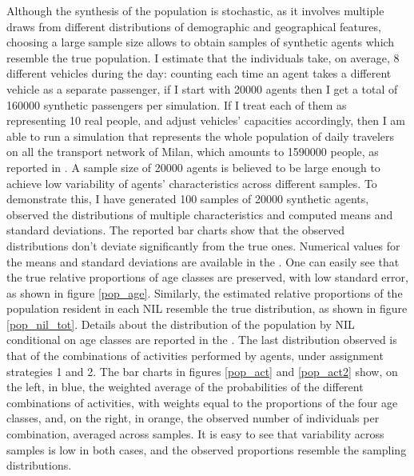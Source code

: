 Although the synthesis of the population is stochastic, as it involves multiple draws from different distributions of demographic and geographical features, choosing a large sample size allows to obtain samples of synthetic agents which resemble the true population. I estimate that the individuals take, on average, 8 different vehicles during the day: counting each time an agent takes a different vehicle as a separate passenger, if I start with 20000 agents then I get a total of 160000 synthetic passengers per simulation. If I treat each of them as representing 10 real people, and adjust vehicles' capacities accordingly, then I am able to run a simulation that represents the whole population of daily travelers on all the transport network of Milan, which amounts to 1590000 people, as reported in \cite{site20}. A sample size of 20000 agents is believed to be large enough to achieve low variability of agents' characteristics across different samples. To demonstrate this, I have generated 100 samples of 20000 synthetic agents, observed the distributions of multiple characteristics and computed means and standard deviations. The reported bar charts show that the observed distributions don't deviate significantly from the true ones. Numerical values for the means and standard deviations are available in the .
One can easily see that the true relative proportions of age classes are preserved, with low standard error, as shown in figure \ref{pop_age}. Similarly, the estimated relative proportions of the population resident in each NIL resemble the true distribution, as shown in figure \ref{pop_nil_tot}. Details about the distribution of the population by NIL conditional on age classes are reported in the . The last distribution observed is that of the combinations of activities performed by agents, under assignment strategies 1 and 2. The bar charts in figures \ref{pop_act} and \ref{pop_act2} show, on the left, in blue, the weighted average of the probabilities of the different combinations of activities, with weights equal to the proportions of the four age classes, and, on the right, in orange, the observed number of individuals per combination, averaged across samples. It is easy to see that variability across samples is low in both cases, and the observed proportions resemble the sampling distributions.

